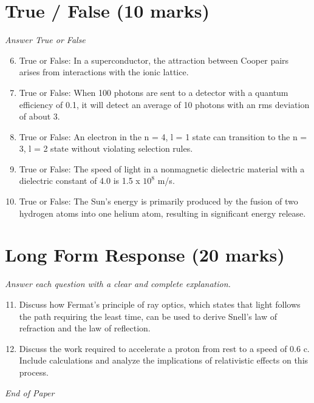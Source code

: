 \documentclass[12pt]{article}
\begin{document}
\section*{True / False (10 marks)}
\textit{Answer True or False}
\begin{enumerate}[label=\arabic*.]
\setcounter{enumi}{5}
\item True or False: In a superconductor, the attraction between Cooper pairs arises from interactions with the ionic lattice.
\item True or False: When 100 photons are sent to a detector with a quantum efficiency of 0.1, it will detect an average of 10 photons with an rms deviation of about 3.
\item True or False: An electron in the n = 4, l = 1 state can transition to the n = 3, l = 2 state without violating selection rules.
\item True or False: The speed of light in a nonmagnetic dielectric material with a dielectric constant of 4.0 is 1.5 x $10^8$ m/s.
\item True or False: The Sun's energy is primarily produced by the fusion of two hydrogen atoms into one helium atom, resulting in significant energy release.
\end{enumerate}

\section*{Long Form Response (20 marks)}
\textit{Answer each question with a clear and complete explanation.}
\begin{enumerate}[label=\arabic*.]
\setcounter{enumi}{10}
\item Discuss how Fermat's principle of ray optics, which states that light follows the path requiring the least time, can be used to derive Snell's law of refraction and the law of reflection.
\item Discuss the work required to accelerate a proton from rest to a speed of 0.6 c. Include calculations and analyze the implications of relativistic effects on this process.
\end{enumerate}

\vfill
\noindent\textit{End of Paper}
\end{document}
